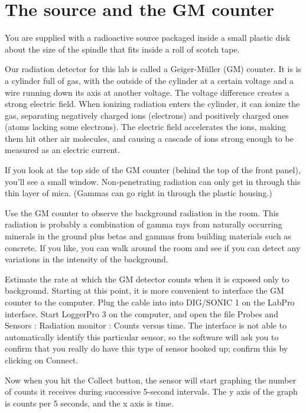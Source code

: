 \section*{The source and the GM counter}

You are supplied with a radioactive source packaged inside
a small plastic disk about the size of the spindle that
fits inside a roll of scotch tape.

Our radiation detector for this lab is called a Geiger-M\"{u}ller (GM) counter.
It is is a cylinder full of gas, with the outside
of the cylinder at a certain voltage and a wire running down
its axis at another voltage. The voltage difference creates
a strong electric field. When ionizing radiation enters
the cylinder, it can ionize the gas, separating negatively
charged ions (electrons) and positively charged ones
(atoms lacking some electrons). The electric field accelerates
the ions, making them hit other air molecules, and causing
a cascade of ions strong enough to be measured as an electric
current.

If you look at the top side of the GM counter (behind the top of the front panel),
you'll see a small window. Non-penetrating radiation can only get in through
this thin layer of mica. (Gammas can go right in through the plastic housing.)

\observations



Use the GM counter to observe the background radiation in the room. This radiation is
probably a combination of gamma rays from naturally occurring minerals
in the ground plus betas and gammas from building materials such 
as concrete. If you like, you can walk around the room and see if you can detect
any variations in the intensity of the background.

Estimate the rate at which the GM detector counts when it is exposed
only to background. Starting at this point, it is more convenient to
interface the GM counter to the computer. Plug the cable into
into DIG/SONIC 1 on the LabPro interface. Start LoggerPro 3 on the
computer, and open the file Probes and Sensors : Radiation monitor : Counts versus time.
The interface is not able to automatically identify this particular sensor, so
the software will ask you to confirm that you really do have this type of sensor
hooked up; confirm this by clicking on Connect.

Now when you hit the Collect button, the sensor will start graphing the number of counts
it receives during successive 5-second intervals. The y axis of the graph is counts
per 5 seconds, and the x axis is time.

